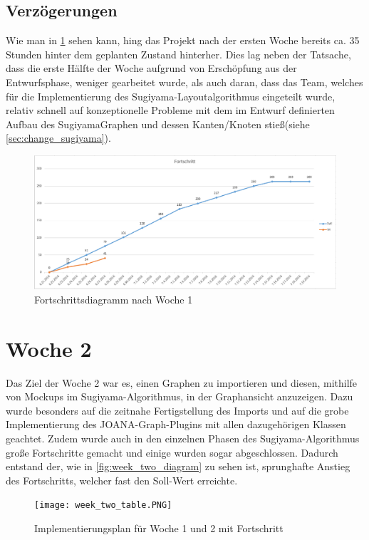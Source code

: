 \subsection{Verzögerungen}
Wie man in \ref{fig:week_one_diagram} sehen kann, hing das Projekt nach der ersten Woche bereits ca. 35 Stunden hinter dem geplanten Zustand hinterher.
Dies lag neben der Tatsache, dass die erste Hälfte der Woche aufgrund von Erschöpfung aus der Entwurfsphase, weniger gearbeitet wurde, als auch daran, dass das Team, welches für die Implementierung des Sugiyama-Layoutalgorithmus eingeteilt wurde, relativ schnell auf konzeptionelle Probleme mit dem im Entwurf definierten Aufbau des SugiyamaGraphen und dessen Kanten/Knoten stieß(siehe \ref{sec:change_sugiyama}).
\begin{figure}[!htbp]
	\centering
	\includegraphics[width=380pt]{resourcen/week_one_diagram.PNG}
	\caption{Fortschrittsdiagramm nach Woche 1}
	\label{fig:week_one_diagram}
\end{figure}

\newpage

\section{Woche 2}
Das Ziel der Woche 2 war es, einen Graphen zu importieren und diesen, mithilfe von Mockups im Sugiyama-Algorithmus, in der Graphansicht anzuzeigen.
Dazu wurde besonders auf die zeitnahe Fertigstellung des Imports und auf die grobe Implementierung des JOANA-Graph-Plugins mit allen dazugehörigen Klassen geachtet. Zudem wurde auch in den einzelnen Phasen des Sugiyama-Algorithmus große Fortschritte gemacht und einige wurden sogar abgeschlossen. Dadurch entstand der, wie in \ref{fig:week_two_diagram} zu sehen ist, sprunghafte Anstieg des Fortschritts, welcher fast den Soll-Wert erreichte. 
\begin{figure}[!htbp]
	\centering
	\texttt{[image: week\_two\_table.PNG]}
	\caption{Implementierungsplan für Woche 1 und 2 mit Fortschritt}
	\label{fig:week_two_table}
\end{figure}
